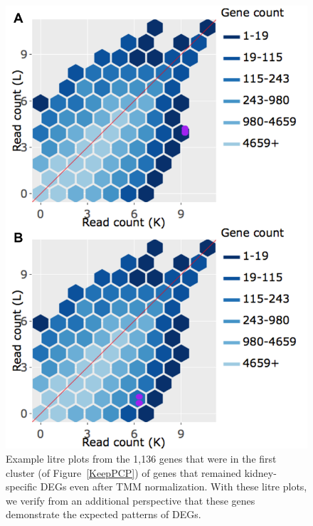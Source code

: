 \documentclass{article}
\begin{document}
\null
\begin{figure}[t!]
\centerline{\includegraphics[width=0.7\columnwidth]{../MakeFigures/Dashboards/litreClusterKeep/litreClusterKeep.jpg}}
\caption{Example litre plots from the 1,136 genes that were in the first cluster (of Figure~\ref{KeepPCP}) of genes that remained kidney-specific DEGs even after TMM normalization. With these litre plots, we verify from an additional perspective that these genes demonstrate the expected patterns of DEGs.
\label{litreClusterKeep}}
\end{figure}
\end{document}

